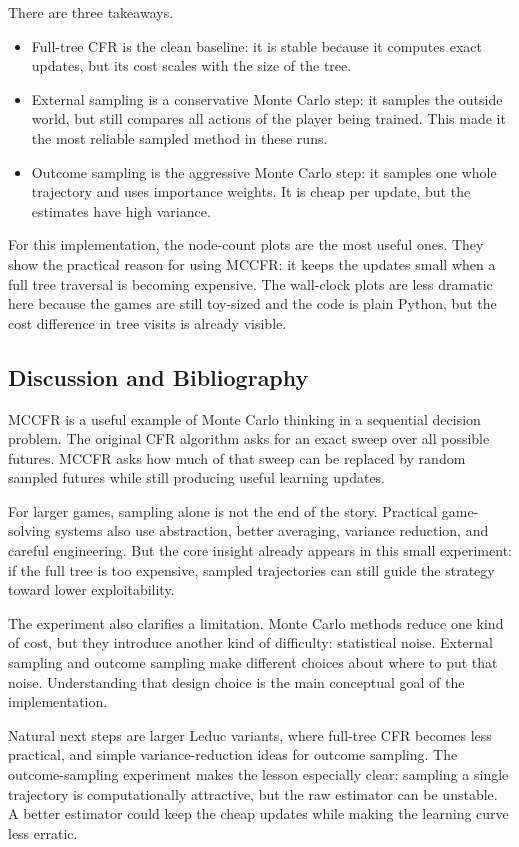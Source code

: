 \documentclass[11pt,reqno,twoside]{article}
\theoremstyle{myThm}
\theoremstyle{myRem}
\theoremstyle{myDef}
\numberwithin{equation}{section}
\begin{document}
There are three takeaways.
\begin{itemize}
\item Full-tree CFR is the clean baseline: it is stable because it computes
exact updates, but its cost scales with the size of the tree.
\item External sampling is a conservative Monte Carlo step: it samples the
outside world, but still compares all actions of the player being trained.
This made it the most reliable sampled method in these runs.
\item Outcome sampling is the aggressive Monte Carlo step: it samples one
whole trajectory and uses importance weights. It is cheap per update, but
the estimates have high variance.
\end{itemize}

For this implementation, the node-count plots are the most useful ones.
They show the practical reason for using MCCFR: it keeps the updates small
when a full tree traversal is becoming expensive. The wall-clock plots are
less dramatic here because the games are still toy-sized and the code is
plain Python, but the cost difference in tree visits is already visible.

\subsection{Discussion and Bibliography}

MCCFR is a useful example of Monte Carlo thinking in a sequential decision
problem. The original CFR algorithm asks for an exact sweep over all
possible futures. MCCFR asks how much of that sweep can be replaced by
random sampled futures while still producing useful learning updates.

For larger games, sampling alone is not the end of the story. Practical
game-solving systems also use abstraction, better averaging, variance
reduction, and careful engineering. But the core insight already appears
in this small experiment: if the full tree is too expensive, sampled
trajectories can still guide the strategy toward lower exploitability.

The experiment also clarifies a limitation. Monte Carlo methods reduce one
kind of cost, but they introduce another kind of difficulty: statistical
noise. External sampling and outcome sampling make different choices about
where to put that noise. Understanding that design choice is the main
conceptual goal of the implementation.

Natural next steps are larger Leduc variants, where full-tree CFR becomes
less practical, and simple variance-reduction ideas for outcome sampling.
The outcome-sampling experiment makes the lesson especially clear:
sampling a single trajectory is computationally attractive, but the raw
estimator can be unstable. A better estimator could keep the cheap updates
while making the learning curve less erratic.
\end{document}
